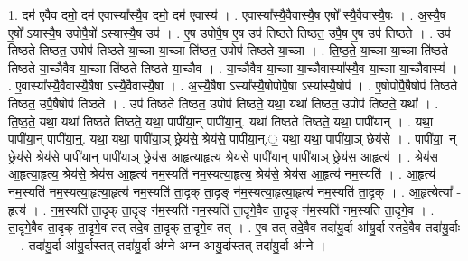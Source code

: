 \documentclass[17pt]{extarticle}
\begin{document}
1. दम॑ ए॒वैव दमो॒ दम॑ ए॒वास्या᳚स्यै॒व दमो॒ दम॑ ए॒वास्य॑ । . ए॒वास्या᳚स्यै॒वैवास्यै॒ष ए॒षो᳚ स्यै॒वैवास्यै॒षः । . अ॒स्यै॒ष ए॒षो᳚ ऽयास्यै॒ष उपोपै॒षो᳚ ऽस्यास्यै॒ष उप॑ । . ए॒ष उपोपै॒ष ए॒ष उप॑ तिष्ठते तिष्ठत॒ उपै॒ष ए॒ष उप॑ तिष्ठते । . उप॑ तिष्ठते तिष्ठत॒ उपोप॑ तिष्ठते या॒च्ञा या॒च्ञा ति॑ष्ठत॒ उपोप॑ तिष्ठते या॒च्ञा । . ति॒ष्ठ॒ते॒ या॒च्ञा या॒च्ञा ति॑ष्ठते तिष्ठते या॒च्ञैवैव या॒च्ञा ति॑ष्ठते तिष्ठते या॒च्ञैव । . या॒च्ञैवैव या॒च्ञा या॒च्ञैवास्या᳚स्यै॒व या॒च्ञा या॒च्ञैवास्य॑ । . ए॒वास्या᳚स्यै॒वैवास्यै॒षैषा ऽस्यै॒वैवास्यै॒षा । . अ॒स्यै॒षैषा ऽस्या᳚स्यै॒षोपोपै॒षा ऽस्या᳚स्यै॒षोप॑ । . ए॒षोपोपै॒षैषोप॑ तिष्ठते तिष्ठत॒ उपै॒षैषोप॑ तिष्ठते । . उप॑ तिष्ठते तिष्ठत॒ उपोप॑ तिष्ठते॒ यथा॒ यथा॑ तिष्ठत॒ उपोप॑ तिष्ठते॒ यथा᳚ । . ति॒ष्ठ॒ते॒ यथा॒ यथा॑ तिष्ठते तिष्ठते॒ यथा॒ पापी॑या॒न् पापी॑या॒न्॒. यथा॑ तिष्ठते तिष्ठते॒ यथा॒ पापी॑यान् । . यथा॒ पापी॑या॒न् पापी॑या॒न्॒. यथा॒ यथा॒ पापी॑या॒ञ् छ्रेय॑से॒ श्रेय॑से॒ पापी॑या॒न्.॒ यथा॒ यथा॒ पापी॑या॒ञ् छेय॑से । . पापी॑या॒~न् छ्रेय॑से॒ श्रेय॑से॒ पापी॑या॒न् पापी॑या॒ञ् छ्रेय॑स आ॒हृत्या॒हृत्य॒ श्रेय॑से॒ पापी॑या॒न् पापी॑या॒ञ् छ्रेय॑स आ॒हृत्य॑ । . श्रेय॑स आ॒हृत्या॒हृत्य॒ श्रेय॑से॒ श्रेय॑स आ॒हृत्य॑ नम॒स्यति॑ नम॒स्यत्या॒हृत्य॒ श्रेय॑से॒ श्रेय॑स आ॒हृत्य॑ नम॒स्यति॑ । . आ॒हृत्य॑ नम॒स्यति॑ नम॒स्यत्या॒हृत्या॒हृत्य॑ नम॒स्यति॑ ता॒दृक् ता॒दृङ् न॑म॒स्यत्या॒हृत्या॒हृत्य॑ नम॒स्यति॑ ता॒दृक् । . आ॒हृत्येत्या᳚ - हृत्य॑ । . न॒म॒स्यति॑ ता॒दृक् ता॒दृङ् न॑म॒स्यति॑ नम॒स्यति॑ ता॒दृगे॒वैव ता॒दृङ् न॑म॒स्यति॑ नम॒स्यति॑ ता॒दृगे॒व । . ता॒दृगे॒वैव ता॒दृक् ता॒दृगे॒व तत् तदे॒व ता॒दृक् ता॒दृगे॒व तत् । . ए॒व तत् तदे॒वैव तदा॑यु॒र्दा आ॑यु॒र्दा स्तदे॒वैव तदा॑यु॒र्दाः । . तदा॑यु॒र्दा आ॑यु॒र्दास्तत् तदा॑यु॒र्दा अ॑ग्ने अग्न आयु॒र्दास्तत् तदा॑यु॒र्दा अ॑ग्ने । \newline
\end{document}
